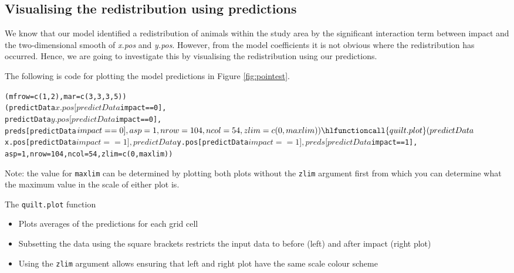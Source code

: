\subsection{Visualising the redistribution using predictions}
\noindent We know that our model identified a redistribution of animals within the study area by the significant interaction term between impact and the two-dimensional smooth of \textit{x.pos} and \textit{y.pos}. However, from the model coefficients it is not obvious where the redistribution has occurred. Hence, we are going to investigate this by visualising the redistribution using our predictions. 

\noindent The following is code for plotting the model predictions in Figure \ref{fig:pointest}.
\begin{knitrout}\footnotesize
{}\color{fgcolor}\begin{kframe}
\begin{alltt}
(mfrow=c(1,2), mar=c(3,3,3,5))
(predictData$x.pos[predictData$impact==0], 
predictData$y.pos[predictData$impact==0], 
preds[predictData$impact==0], asp=1, nrow=104, ncol=54, 
zlim=c(0, maxlim))
\hlfunctioncall{quilt.plot}(predictData$x.pos[predictData$impact==1], 
predictData$y.pos[predictData$impact==1], preds[predictData$impact==1], 
asp=1,nrow=104, ncol=54, zlim=c(0, maxlim))
\end{alltt}
\end{kframe}
\end{knitrout}
\noindent Note: the value for {\tt maxlim} can be determined by plotting both plots without the {\tt zlim} argument first from which you can determine what the maximum value in the scale of either plot is. 
\begin{block}{The {\tt quilt.plot} function}
\begin{itemize}
\item{Plots averages of the predictions for each grid cell}
\item{Subsetting the data using the square brackets restricts the input data to before (left) and after impact (right plot)}
\item{Using the {\tt zlim} argument allows ensuring that left and right plot have the same scale colour scheme}
\end{itemize}
\end{block}

